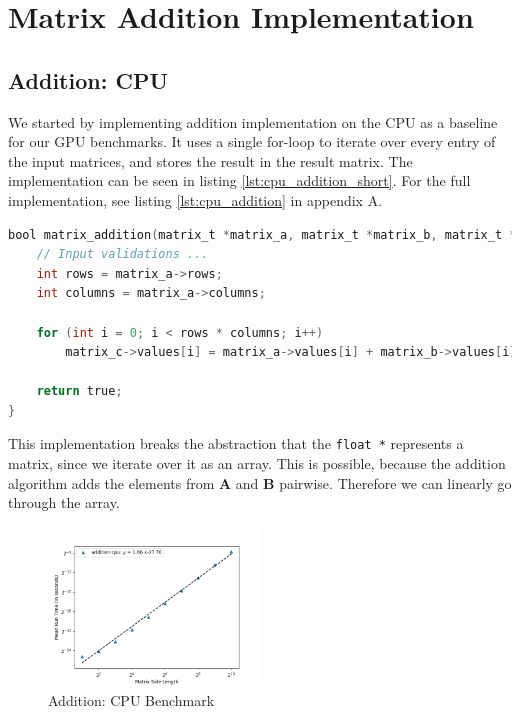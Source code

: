 \section{Matrix Addition Implementation}

\subsection{Addition: CPU}

We started by implementing addition implementation on the CPU as a baseline for our GPU benchmarks. It uses a single for-loop to iterate over every entry of the input matrices, and stores the result in the result matrix. The implementation can be seen in listing \ref{lst:cpu_addition_short}. For the full implementation, see listing \ref{lst:cpu_addition} in appendix A. 


\begin{lstlisting}[language=C, caption={CPU addition algorithm}, label={lst:cpu_addition_short}]
bool matrix_addition(matrix_t *matrix_a, matrix_t *matrix_b, matrix_t *matrix_c) {
    // Input validations ...
    int rows = matrix_a->rows;
    int columns = matrix_a->columns;

    for (int i = 0; i < rows * columns; i++)
        matrix_c->values[i] = matrix_a->values[i] + matrix_b->values[i];

    return true;
}
\end{lstlisting}

This implementation breaks the abstraction that the \texttt{float *} represents a matrix, since we iterate over it as an array. This is possible, because the addition algorithm adds the elements from $\mathbf{A}$ and $\mathbf{B}$ pairwise. Therefore we can linearly go through the array.

\begin{figure}
    \centering
    \includegraphics[width=0.5\textwidth]{SavedBenchmarksAndDiagrams/Machine 2/Addition/CPU.png}
    \caption{Addition: CPU Benchmark}
    \label{fig:addition_cpu_bench}
\end{figure}

